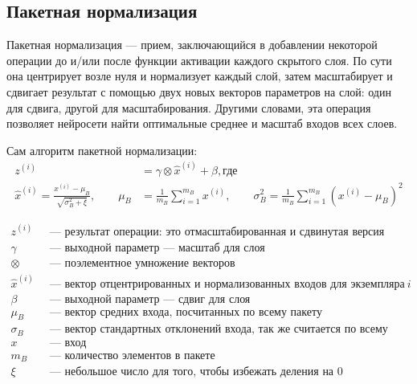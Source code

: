 \subsection{Пакетная нормализация}
Пакетная нормализация --- прием, заключающийся в добавлении некоторой операции
до и/или после функции активации каждого скрытого слоя. По сути она центрирует
возле нуля и нормализует каждый слой, затем масштабирует и сдвигает результат с
помощью двух новых векторов параметров на слой: один для сдвига, другой для
масштабирования. Другими словами, эта операция позволяет нейросети найти
оптимальные среднее и масштаб входов всех слоев.

Сам алгоритм пакетной нормализации:
\begin{align*}
	z^{(i)} & = \gamma \otimes \hat x^{(i)} + \beta, \text{где}        \\
	\hat x^{(i)} = \frac{x^{(i)} - \mu_B}{\sqrt{\sigma^2_B + \xi}}, \qquad
	\mu_B   & = \frac{1}{m_B} \sum\limits_{i = 1}^{m_B}x^{(i)}, \qquad
	\sigma_B^2 = \frac{1}{m_B} \sum\limits_{i = 1}^{m_B}(x^{(i)} - \mu_B)^2
\end{align*}

\begin{align*}
	z^{(i)}      & \: \text{ --- результат операции: это отмасштабированная и сдвинутая версия входов}  \\
	\gamma       & \: \text{ --- выходной параметр --- масштаб для слоя}                                \\
	\otimes      & \: \text{ --- поэлементное умножение векторов}                                       \\
	\hat x^{(i)} & \: \text{ --- вектор отцентрированных и нормализованных входов для экземпляра} \: i  \\
	\beta        & \: \text{ --- выходной параметр --- сдвиг для слоя}                                  \\
	\mu_B        & \: \text{ --- вектор средних входа, посчитанных по всему пакету}                     \\
	\sigma_B     & \: \text{ --- вектор стандартных отклонений входа, так же считается по всему пакету} \\
	x            & \: \text{ --- вход}                                                                  \\
	m_B          & \: \text{ --- количество элементов в пакете}                                         \\
	\xi          & \: \text{ --- небольшое число для того, чтобы избежать деления на 0}
\end{align*}

